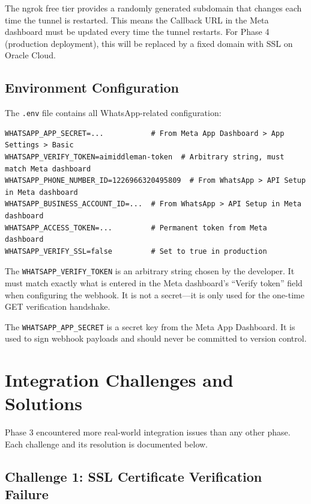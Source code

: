 \documentclass[12pt, a4paper]{report}
\begin{document}
The ngrok free tier provides a randomly generated subdomain that changes each time the tunnel is restarted. This means the Callback URL in the Meta dashboard must be updated every time the tunnel restarts. For Phase 4 (production deployment), this will be replaced by a fixed domain with SSL on Oracle Cloud.

\subsection{Environment Configuration}

The \texttt{.env} file contains all WhatsApp-related configuration:

\begin{lstlisting}[style=bashstyle, caption={WhatsApp-related .env variables}]
WHATSAPP_APP_SECRET=...           # From Meta App Dashboard > App Settings > Basic
WHATSAPP_VERIFY_TOKEN=aimiddleman-token  # Arbitrary string, must match Meta dashboard
WHATSAPP_PHONE_NUMBER_ID=1226966320495809  # From WhatsApp > API Setup in Meta dashboard
WHATSAPP_BUSINESS_ACCOUNT_ID=...  # From WhatsApp > API Setup in Meta dashboard
WHATSAPP_ACCESS_TOKEN=...         # Permanent token from Meta dashboard
WHATSAPP_VERIFY_SSL=false         # Set to true in production
\end{lstlisting}

The \texttt{WHATSAPP\_VERIFY\_TOKEN} is an arbitrary string chosen by the developer. It must match exactly what is entered in the Meta dashboard's ``Verify token'' field when configuring the webhook. It is not a secret---it is only used for the one-time GET verification handshake.

The \texttt{WHATSAPP\_APP\_SECRET} is a secret key from the Meta App Dashboard. It is used to sign webhook payloads and should never be committed to version control.

\section{Integration Challenges and Solutions}

Phase 3 encountered more real-world integration issues than any other phase. Each challenge and its resolution is documented below.

\subsection{Challenge 1: SSL Certificate Verification Failure}
\end{document}
